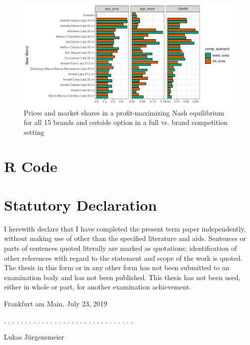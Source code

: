 \documentclass[12pt,a4paper]{article}
\begin{document}
\begin{figure}[ht]
	\centering
  \includegraphics[scale = 0.7]{figures/bar_price_share_full_brand_15.pdf}
	\caption{Prices and market shares in a profit-maximizing Nash equilibrium for all 15 brands and outside option in a full vs. brand competition setting}
	\label{fig_bar_fifteen}
\end{figure}



\section{R Code}

%
%


\clearpage


\newpage
\thispagestyle{empty}
\section*{Statutory Declaration}

I herewith declare that I have completed the present term paper independently, without making use of
other than the specified literature and aids. Sentences or parts of sentences quoted literally are
marked as quotations; identification of other references with regard to the statement and scope of
the work is quoted. The thesis in this form or in any other form has not been submitted to an examination body and has not been published.
This thesis has not been used, either in whole or part, for another examination achievement.

\vspace{1cm}

Frankfurt am Main, July 23, 2019
\vspace{2cm}

. . . . . . . . . . . . . . . . . . . . . . . . . . . . . . .
\vspace{0.1cm}

Lukas J\"urgensmeier
\end{document}
